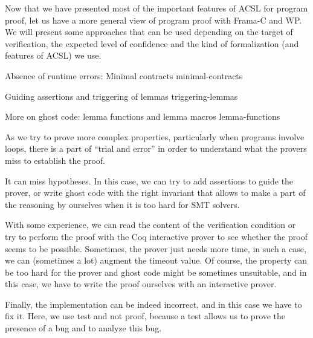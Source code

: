 Now that we have presented most of the important features of ACSL for program
proof, let us have a more general view of program proof with Frama-C and WP. We
will present some approaches that can be used depending on the target of
verification, the expected level of confidence and the kind of formalization
(and features of ACSL) we use.



\begin{levelTwo}
  {Absence of runtime errors: Minimal contracts}
  {minimal-contracts}
\end{levelTwo}

\begin{levelTwo}
  {Guiding assertions and triggering of lemmas}
  {triggering-lemmas}
\end{levelTwo}

\begin{levelTwo}
  {More on ghost code: lemma functions and lemma macros}
  {lemma-functions}
\end{levelTwo}



\horizontalLine
\newpage

As we try to prove more complex properties, particularly when
programs involve loops, there is a part of ``trial and error'' in
order to understand what the provers miss to establish the proof.

It can miss hypotheses. In this case, we can try to add assertions to
guide the prover, or write ghost code with the right invariant that
allows to make a part of the reasoning by ourselves when it is too hard
for SMT solvers.

With some experience, we can read the content of the verification condition or
try to perform the proof with the Coq interactive prover to see whether
the proof seems to be possible. Sometimes, the prover just needs more
time, in such a case, we can (sometimes a lot) augment the timeout value.
Of course, the property can be too hard for the prover and ghost code
might be sometimes unsuitable, and in this case, we have to write the
proof ourselves with an interactive prover.

Finally, the implementation can be indeed incorrect, and in this case we
have to fix it. Here, we use test and not proof, because a test
allows us to prove the presence of a bug and to analyze this bug.
